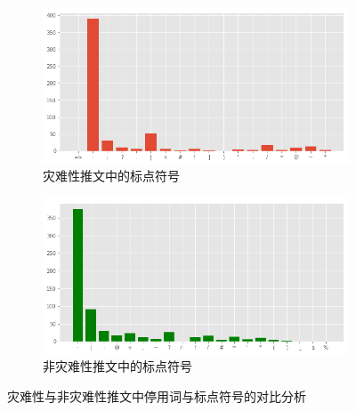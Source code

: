 \begin{figure}[H]
    \begin{subfigure}[b]{0.48\textwidth}
        \centering
        \includegraphics[width=\textwidth]{figures/LSTM7.png}
        \caption{灾难性推文中的标点符号}
        \label{fig:punct_disaster}
    \end{subfigure}
    \hfill
    \begin{subfigure}[b]{0.48\textwidth}
        \centering
        \includegraphics[width=\textwidth]{figures/LSTM8.png}
        \caption{非灾难性推文中的标点符号}
        \label{fig:punct_non_disaster}
    \end{subfigure}
    \caption{灾难性与非灾难性推文中停用词与标点符号的对比分析}
    \label{fig:lstm_eda_stop_punct}
\end{figure}


